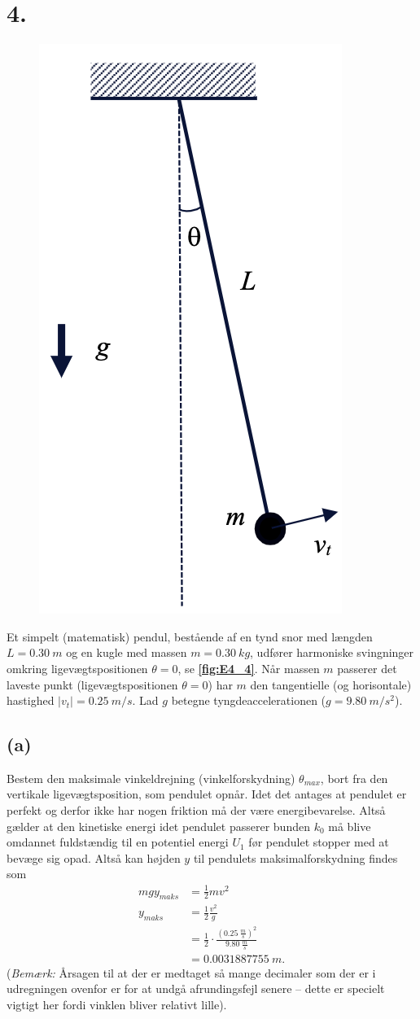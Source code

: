 \documentclass[12pt]{article}
\theoremstyle{definition}
\begin{document}
\section*{4.}
\begin{figure} [ht]
  \centering
  \caption{}
  \includegraphics[width=0.3\linewidth]{../figures/E4_4.png}
  \label{fig:E4_4}
\end{figure}

Et simpelt (matematisk) pendul, bestående af en tynd snor med længden $L = \qty{0,30}{m}$ og en kugle med massen $m = \qty{0,30}{kg}$, udfører harmoniske svingninger omkring ligevægtspositionen $\theta = 0$, se \textbf{\autoref{fig:E4_4}}. Når massen $m$ passerer det laveste punkt (ligevægtspositionen $\theta = 0$) har $m$ den tangentielle (og horisontale) hastighed $|v_t| = \qty{0,25}{m \per s}$. Lad $g$ betegne tyngdeaccelerationen ($g = \qty{9,80}{m \per s^2}$).

\subsection*{(a)}
Bestem den maksimale vinkeldrejning (vinkelforskydning) $\theta_{max}$, bort fra den vertikale ligevægtsposition, som pendulet opnår.
\bigbreak
Idet det antages at pendulet er perfekt og derfor ikke har nogen friktion må der være energibevarelse. Altså gælder at den kinetiske energi idet pendulet passerer bunden $k_0$ må blive omdannet fuldstændig til en potentiel energi $U_1$ før pendulet stopper med at bevæge sig opad. Altså kan højden $y$ til pendulets maksimalforskydning findes som
\begin{align*}
  mgy_{maks} &= \frac{1}{2}mv^2 \\
  y_{maks} &= \frac{1}{2} \frac{v^2}{g} \\
  &= \frac{1}{2} \cdot \frac{\left( \qty{0,25}{\frac{m}{s}}  \right)^2}{\qty{9,80}{\frac{m}{s}}} \\
  &= \qty{0,0031887755}{m} 
.\end{align*}
(\textit{Bemærk:} Årsagen til at der er medtaget så mange decimaler som der er i udregningen ovenfor er for at undgå afrundingsfejl senere -- dette er specielt vigtigt her fordi vinklen bliver relativt lille).
\end{document}
